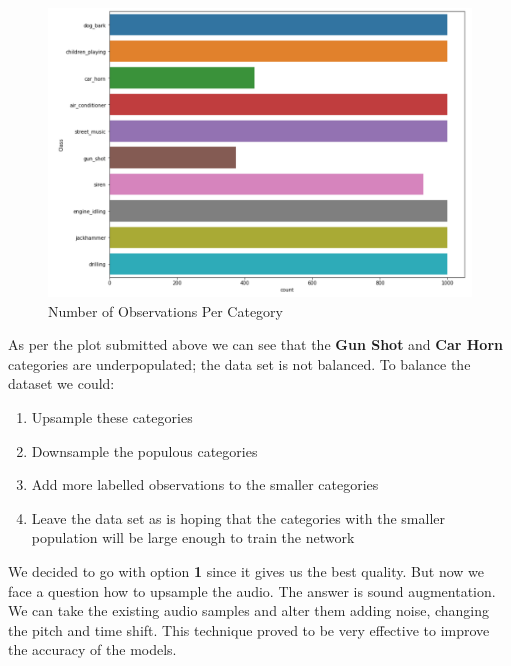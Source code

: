 \begin{Schunk}
\begin{figure}[H]

{\centering \includegraphics[width=1\linewidth]{../images/classPopulation} 

}

\caption[Number of Observations Per Category]{Number of Observations Per Category}\label{fig:unnamed-chunk-3}
\end{figure}
\end{Schunk}

As per the plot submitted above we can see that the \textbf{Gun Shot}
and \textbf{Car Horn} categories are underpopulated; the data set is not
balanced. To balance the dataset we could:

\begin{enumerate}
\def\labelenumi{\arabic{enumi}.}
\tightlist
\item
  Upsample these categories
\item
  Downsample the populous categories
\item
  Add more labelled observations to the smaller categories
\item
  Leave the data set as is hoping that the categories with the smaller
  population will be large enough to train the network
\end{enumerate}

We decided to go with option \textbf{1} since it gives us the best
quality. But now we face a question how to upsample the audio. The
answer is sound augmentation. We can take the existing audio samples and
alter them adding noise, changing the pitch and time shift. This
technique proved to be very effective to improve the accuracy of the
models.

